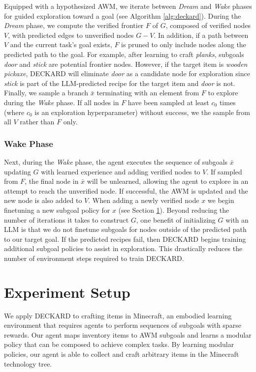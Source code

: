 \documentclass[nohyperref]{article}
\theoremstyle{plain}
\theoremstyle{definition}
\theoremstyle{remark}
\newcommand{\agentshort}{\textsc{DECKARD}}
\begin{document}
Equipped with a hypothesized AWM, we iterate between \emph{Dream} and \emph{Wake} phases for guided exploration toward a goal (see Algorithm \ref{alg:deckard}).
During the \emph{Dream} phase, we compute the verified frontier $F$ of $G$, composed of verified nodes $V$, with predicted edges to unverified nodes $G-V$.
In addition, if a path between $V$ and the current task's goal exists, $F$ is pruned to only include nodes along the predicted path to the goal.
For example, after learning to craft \emph{planks}, subgoals \emph{door} and \emph{stick} are potential frontier nodes.
However, if the target item is \emph{wooden pickaxe}, \agentshort{} will eliminate \emph{door} as a candidate node for exploration since \emph{stick} is part of the LLM-predicted recipe for the target item and \emph{door} is not.
Finally, we sample a branch $\bar{x}$ terminating with an element from $F$ to explore during the \emph{Wake} phase.
If all nodes in $F$ have been sampled at least $c_0$ times (where $c_0$ is an exploration hyperparameter) without success, we the sample from all $V$ rather than $F$ only.

\subsubsection{Wake Phase}
\label{sec:wake}

Next, during the \emph{Wake} phase, the agent executes the sequence of subgoals $\bar{x}$ updating $G$ with learned experience and adding verified nodes to $V$.
If sampled from $F$, the final node in $\bar{x}$ will be unlearned, allowing the agent to explore in an attempt to reach the unverified node.
If successful, the AWM is updated and the new node is also added to $V$.
When adding a newly verified node $x$ we begin finetuning a new subgoal policy for $x$ (see Section \ref{sec:agent}).
Beyond reducing the number of iterations it takes to construct $G$, one benefit of initializing $G$ with an LLM is that we do not finetune subgoals for nodes outside of the predicted path to our target goal.
If the predicted recipes fail, then \agentshort{} begins training additional subgoal policies to assist in exploration.
This drastically reduces the number of environment steps required to train \agentshort{}.

\section{Experiment Setup}
\label{sec:agent}

We apply \agentshort{} to crafting items in Minecraft, an embodied learning environment that requires agents to perform sequences of subgoals with sparse rewards.
Our agent maps inventory items to AWM subgoals and learns a modular policy that can be composed to achieve complex tasks.
By learning modular policies, our agent is able to collect and craft arbitrary items in the Minecraft technology tree.
\end{document}
